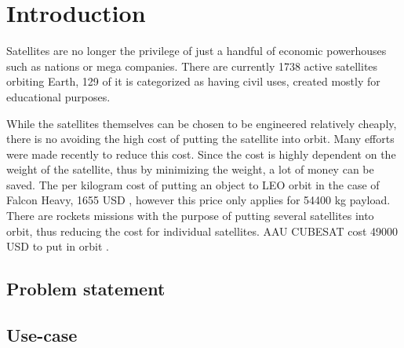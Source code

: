 \chapter{Introduction}\label{chap:Introduction}

Satellites are no longer the privilege of just a handful of economic powerhouses such as nations or mega companies. There are currently 1738 active satellites orbiting Earth, 129 of it is categorized as having civil uses, created mostly for educational purposes.


 While the satellites themselves can be chosen to be engineered relatively cheaply, there is no avoiding the high cost of putting the satellite into orbit. Many efforts were made recently to reduce this cost.  Since the cost is highly dependent on the weight of the satellite, thus by minimizing the weight, a lot of money can be saved. The per kilogram cost of putting an object to LEO orbit in the case of Falcon Heavy, 1655 USD \cite{spaceX}, however this price only applies for 54400 kg payload. There are rockets missions with the purpose of putting several satellites into orbit, thus reducing the cost for individual satellites. AAU CUBESAT cost 49000 USD to put in orbit \cite{AAUSATpres}. 


\section{Problem statement}


\section{Use-case}\label{sec:useCase}


